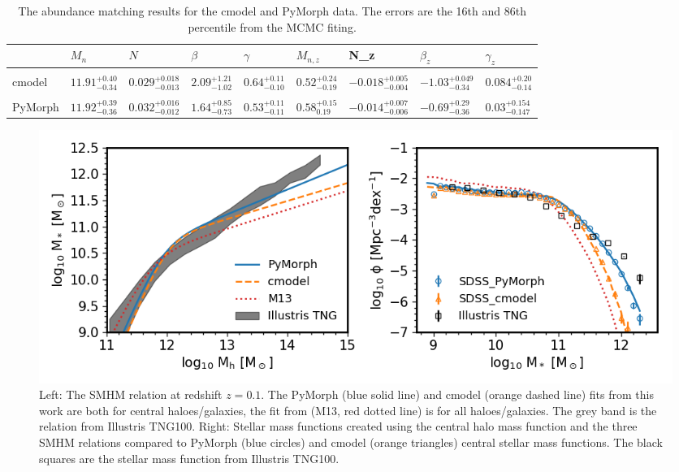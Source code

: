 \begin{table}
\centering
\begin{tabular}{l||llll|llll}
        & $M_n$ & $N$     & $\beta$ & $\gamma$ & $M_{n,z}$ & N\_z   & $\beta_z$ & $\gamma_z$ \\ \hline
\\
cmodel  & $11.91_{-0.34}^{+0.40}$ & $0.029_{-0.013}^{+0.018}$ & $2.09_{-1.02}^{+1.21}$    & $0.64_{-0.10}^{+0.11}$     & $0.52_{-0.19}^{+0.24}$       & $-0.018_{-0.004}^{+0.005}$ & $-1.03_{-0.34}^{+0.049}$     & $0.084_{-0.14}^{+0.20}$      \\
\\
PyMorph & $11.92_{-0.36}^{+0.39}$ & $0.032_{-0.012}^{+0.016}$ & $1.64_{-0.73}^{+0.85}$     & $0.53_{-0.11}^{+0.11}$     & $0.58_{0.19}^{+0.15}$        & $-0.014_{-0.006}^{+0.007}$ & $-0.69_{-0.36}^{+0.29}$      & $0.03_{-0.147}^{+0.154}$      
\end{tabular}
\caption{The abundance matching results for the cmodel and PyMorph data. The errors are the 16th and 86th percentile from the MCMC fiting.}
\label{tab:AbnResult}
\end{table}

\begin{figure}[h]
    \centering
    \includegraphics[width = \linewidth]{Figures/Chapter2/AbundaceMtch_Data.png}
    \caption{Left: The SMHM relation at redshift $z=0.1$. The PyMorph (blue solid line) and cmodel (orange dashed line) fits from this work are both for central haloes/galaxies, the fit from \citet{Moster2013} (M13, red dotted line) is for all haloes/galaxies. The grey band is the relation from Illustris TNG100. Right: Stellar mass functions created using the central halo mass function and the three SMHM relations compared to PyMorph (blue circles) and cmodel (orange triangles) central stellar mass functions. The black squares are the stellar mass function from Illustris TNG100.}
    \label{fig:Abn_Data}
\end{figure}

